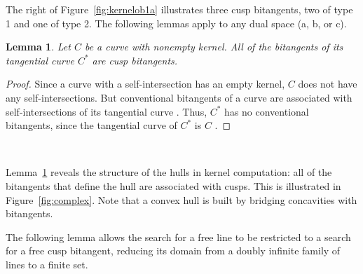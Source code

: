 \documentclass{sig-alternate}
\newcommand{\QED}{\vrule height 1.4ex width 1.0ex depth -.1ex\ \vspace{.3in}} %
\newcommand{\prf}{\noindent{{\bf Proof}:\ \ \ }}
\newtheorem{lemma}[theorem]{Lemma}
\begin{document}
\noindent The right of Figure~\ref{fig:kernelob1a} illustrates three cusp bitangents,
two of type 1 and one of type 2.
The following lemmas apply to any dual space (a, b, or c).


\begin{lemma}
\label{lem:allcusp}
Let $C$ be a curve with nonempty kernel.
All of the bitangents of its tangential curve $C^*$ are cusp bitangents.
\end{lemma}
\ifACM
\begin{proof}
\else
\prf
\fi
Since a curve with a self-intersection has an empty kernel,
$C$ does not have any self-intersections.
But conventional bitangents of a curve are associated
with self-intersections of its tangential curve \cite{jj01}.
Thus, $C^*$ has no conventional bitangents, since the tangential curve of $C^*$ is $C$ \cite{jj02}.
\ifACM
\end{proof}
\else
\QED
\fi

Lemma~\ref{lem:allcusp} reveals the structure of the hulls in kernel computation:
all of the bitangents that define the hull are associated with cusps.
This is illustrated in Figure~\ref{fig:complex}.
Note that a convex hull is built by bridging concavities with bitangents.

The following lemma allows the search for a free line to be restricted
to a search for a free cusp bitangent,
reducing its domain from a doubly infinite family of lines to a finite set.
\end{document}
